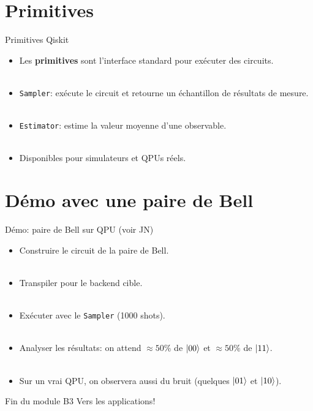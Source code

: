\documentclass[aspectratio=169,12pt]{beamer}
\begin{document}
\section{Primitives}

\begin{frame}{Primitives Qiskit}
  \begin{itemize}[<+->]
    \setlength{\itemsep}{0.8em}
    \item Les \textbf{primitives} sont l'interface standard pour exécuter des circuits.\\~\\
    \item \texttt{Sampler}: exécute le circuit et retourne un échantillon de résultats de mesure.\\~\\
    \item \texttt{Estimator}: estime la valeur moyenne d'une observable.\\~\\
    \item Disponibles pour simulateurs et QPUs réels.
  \end{itemize}
\end{frame}

\section{Démo avec une paire de Bell}

\begin{frame}{Démo: paire de Bell sur QPU (voir JN)}
  \begin{itemize}[<+->]
    \item Construire le circuit de la paire de Bell.\\~\\
    \item Transpiler pour le backend cible.\\~\\
    \item Exécuter avec le \texttt{Sampler} (1000 shots).\\~\\
    \item Analyser les résultats: on attend $\approx 50\%$ de $\ket{00}$ et $\approx 50\%$ de $\ket{11}$.\\~\\
    \item Sur un vrai QPU, on observera aussi du bruit (quelques $\ket{01}$ et $\ket{10}$).
  \end{itemize}
\end{frame}

\begin{frame}{Fin du module B3}
  \centering
  \vfill
  Vers les applications!
  \vfill
\end{frame}
\end{document}
